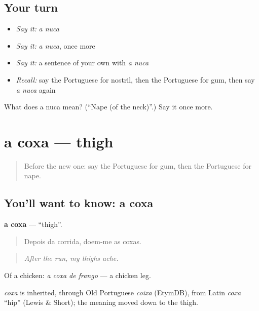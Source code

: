 \subsection*{Your turn}
\begin{itemize}
\raggedright
  \item \emph{Say it:} \emph{a nuca}
  \item \emph{Say it:} \emph{a nuca}, once more
  \item \emph{Say it:} a sentence of your own with \emph{a nuca}
  \item \emph{Recall:} say the Portuguese for nostril, then the Portuguese for gum, then say \emph{a nuca} again
\end{itemize}

\begin{tcolorbox}[breakable,colback=teal!4,colframe=teal!35!black,title={Before you move on}]
What does a nuca mean? (\textquotedblleft{}Nape (of the neck)\textquotedblright{}.) Say it once more.
\end{tcolorbox}
\section[a coxa]{a coxa — thigh}

\label{lesson:PT-C482-coxa}



\begin{quote}
Before the new one: say the Portuguese for gum, then the Portuguese for nape.
\end{quote}

\subsection*{You'll want to know: a coxa}
\textbf{a coxa} — \textquotedblleft{}thigh\textquotedblright{}.

\begin{quote}
Depois da corrida, doem-me as coxas.
\end{quote}

\begin{quote}
\emph{After the run, my thighs ache.}
\end{quote}

Of a chicken: \emph{a coxa de frango} — a chicken leg.

\begin{cousinweb}
\emph{coxa} is inherited, through Old Portuguese \emph{coixa} (EtymDB), from Latin \emph{coxa} \textquotedblleft{}hip\textquotedblright{} (Lewis \& Short); the meaning moved down to the thigh.
\end{cousinweb}

